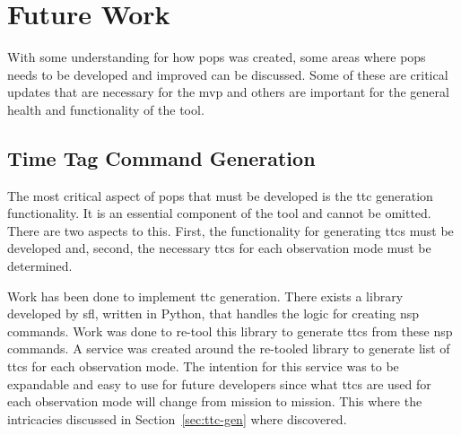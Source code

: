 


\section{Future Work}

With some understanding for how \gls{pops} was created, some areas where
\gls{pops} needs to be developed and improved can be discussed. Some of these
are critical updates that are necessary for the \gls{mvp} and others are
important for the general health and functionality of the tool.

\subsection{Time Tag Command Generation}

The most critical aspect of \gls{pops} that must be developed is the \gls{ttc}
generation functionality. It is an essential component of the tool and cannot
be omitted. There are two aspects to this. First, the functionality for
generating \glspl{ttc} must be developed and, second, the necessary \glspl{ttc}
for each observation mode must be determined.

Work has been done to implement \gls{ttc} generation. There exists a library
developed by \gls{sfl}, written in Python, that handles the logic for creating
\gls{nsp} commands. Work was done to re-tool this library to generate
\glspl{ttc} from these \gls{nsp} commands. A service was created around the
re-tooled library to generate list of \glspl{ttc} for each observation mode.
The intention for this service was to be expandable and easy to use for future
developers since what \glspl{ttc} are used for each observation mode will
change from mission to mission. This where the intricacies discussed in
Section~\ref{sec:ttc-gen} where discovered.  

